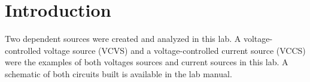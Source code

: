 \section{Introduction}\label{sec:intro}
Two dependent sources were created and analyzed in this lab. A voltage-controlled voltage source (VCVS) and a voltage-controlled current source (VCCS) were the examples of both voltages sources and current sources in this lab. A schematic of both circuits built is available in the lab manual. \cite[p.~18]{lab-manual}
